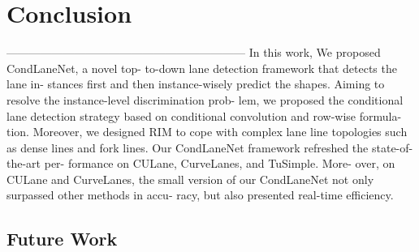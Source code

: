 
\chapter{Conclusion} %

\label{Chapter6} %



---------------------------------------------------------------
In this work, We proposed CondLaneNet, a novel top-
to-down lane detection framework that detects the lane in-
stances first and then instance-wisely predict the shapes.
Aiming to resolve the instance-level discrimination prob-
lem, we proposed the conditional lane detection strategy
based on conditional convolution and row-wise formula-
tion. Moreover, we designed RIM to cope with complex
lane line topologies such as dense lines and fork lines. Our
CondLaneNet framework refreshed the state-of-the-art per-
formance on CULane, CurveLanes, and TuSimple. More-
over, on CULane and CurveLanes, the small version of our
CondLaneNet not only surpassed other methods in accu-
racy, but also presented real-time efficiency.
\section{Future Work}